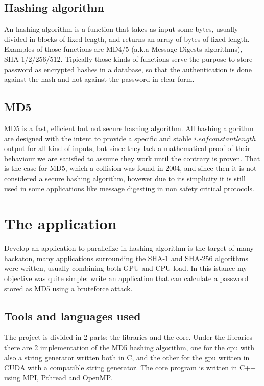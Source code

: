 \documentclass[12pt,a4paper]{article}
\begin{document}
\subsection{Hashing algorithm}
An hashing algorithm is a function that takes as input some bytes, usually divided in blocks of fixed length, and returns an array of bytes of fixed length. Examples of those functions are MD4/5 (a.k.a Message Digests algorithms), SHA-1/2/256/512. Tipically those kinds of functions serve the purpose to store password as encrypted hashes in a database, so that the authentication is done against the hash and not against the password in clear form. 

\subsection{MD5}
MD5 is a fast, efficient but not secure hashing algorithm. All hashing algorithm are designed with the intent to provide a specific and stable \(i.e of constant length\) output for all kind of inputs, but since they lack a mathematical proof of their behaviour we are satisfied to assume they work until the contrary is proven. That is the case for MD5, which a collision was found in 2004, and since then it is not considered a secure hashing algorithm, hovewer due to its simplicity it is still used in some applications like message digesting in non safety critical protocols.

\section{The application}
Develop an application to parallelize in hashing algorithm is the target of many hackaton, many applications surrounding the SHA-1 and SHA-256 algorithms were written, usually combining both GPU and CPU load. In this istance my objective was quite simple: write an application that can calculate a password stored as MD5 using a bruteforce attack.

\subsection{Tools and languages used}
The project is divided in 2 parts: the libraries and the core. Under the libraries there are 2 implementation of the MD5 hashing algorithm, one for the cpu with also a string generator written both in C,  and the other for the gpu written in CUDA with a compatible string generator. The core program is written in C++ using MPI, Pthread and OpenMP.
\end{document}
